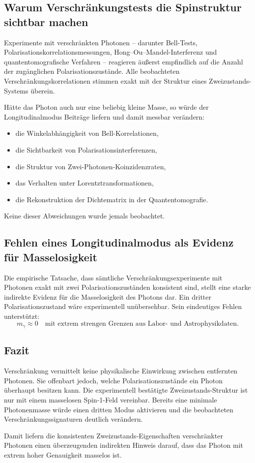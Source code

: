 \subsection*{Warum Verschränkungstests die Spinstruktur sichtbar machen}
Experimente mit verschränkten Photonen – darunter Bell-Tests, 
Polarisationskorrelationsmessungen, Hong--Ou--Mandel-Interferenz und 
quantentomografische Verfahren – reagieren äußerst empfindlich auf die 
Anzahl der zugänglichen Polarisationszustände.  
Alle beobachteten Verschränkungskorrelationen stimmen exakt mit der 
Struktur eines Zweizustands-Systems überein.

Hätte das Photon auch nur eine beliebig kleine Masse, so würde der 
Longitudinalmodus Beiträge liefern und damit messbar verändern:
\begin{itemize}
	\item die Winkelabhängigkeit von Bell-Korrelationen,
	\item die Sichtbarkeit von Polarisationsinterferenzen,
	\item die Struktur von Zwei-Photonen-Koinzidenzraten,
	\item das Verhalten unter Lorentztransformationen,
	\item die Rekonstruktion der Dichtematrix in der Quantentomografie.
\end{itemize}
Keine dieser Abweichungen wurde jemals beobachtet.

\subsection*{Fehlen eines Longitudinalmodus als Evidenz für Masselosigkeit}
Die empirische Tatsache, dass sämtliche Verschränkungsexperimente mit 
Photonen exakt mit zwei Polarisationszuständen konsistent sind, stellt 
eine starke indirekte Evidenz für die Masselosigkeit des Photons dar. 
Ein dritter Polarisationszustand wäre experimentell unübersehbar.
Sein eindeutiges Fehlen unterstützt:
\[
m_\gamma \approx 0
\quad\text{mit extrem strengen Grenzen aus Labor- und Astrophysikdaten}.
\]

\subsection*{Fazit}
Verschränkung vermittelt keine physikalische Einwirkung zwischen 
entfernten Photonen. Sie offenbart jedoch, welche Polarisationszustände 
ein Photon überhaupt besitzen kann. Die experimentell bestätigte 
Zweizustands-Struktur ist nur mit einem masselosen Spin-1-Feld 
vereinbar. Bereits eine minimale Photonenmasse würde einen dritten Modus 
aktivieren und die beobachteten Verschränkungssignaturen deutlich 
verändern.

Damit liefern die konsistenten Zweizustands-Eigenschaften verschränkter 
Photonen einen überzeugenden indirekten Hinweis darauf, dass das Photon 
mit extrem hoher Genauigkeit masselos ist.
